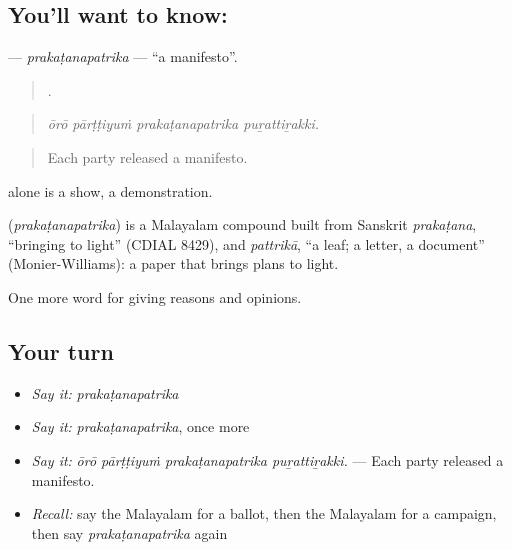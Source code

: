 \subsection*{You'll want to know: }
\textbf{} — \emph{prakaṭanapatrika} — \textquotedblleft{}a manifesto\textquotedblright{}.

\begin{quote}
   .
\end{quote}

\begin{quote}
\emph{ōrō pārṭṭiyuṁ prakaṭanapatrika puṟattiṟakki.}
\end{quote}

\begin{quote}
Each party released a manifesto.
\end{quote}

 alone is a show, a demonstration.

\begin{cousinweb}
\textbf{} (\emph{prakaṭanapatrika}) is a Malayalam compound built from Sanskrit \emph{prakaṭana}, \textquotedblleft{}bringing to light\textquotedblright{} (CDIAL 8429), and \emph{pattrikā}, \textquotedblleft{}a leaf; a letter, a document\textquotedblright{} (Monier-Williams): a paper that brings plans to light.
\end{cousinweb}

\begin{grammarlens}[title={What you've built}]
One more word for giving reasons and opinions.
\end{grammarlens}

\subsection*{Your turn}
\begin{itemize}
\raggedright
  \item \emph{Say it:} \emph{prakaṭanapatrika}
  \item \emph{Say it:} \emph{prakaṭanapatrika}, once more
  \item \emph{Say it:} \emph{ōrō pārṭṭiyuṁ prakaṭanapatrika puṟattiṟakki.} — Each party released a manifesto.
  \item \emph{Recall:} say the Malayalam for a ballot, then the Malayalam for a campaign, then say \emph{prakaṭanapatrika} again
\end{itemize}

